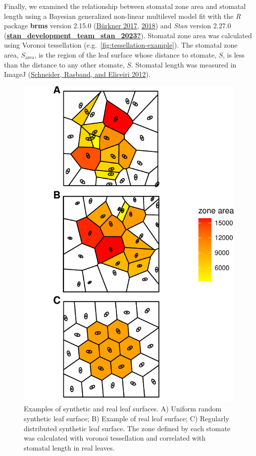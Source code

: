 \documentclass[12pt,halfline,a4paper,]{ouparticle}
\begin{document}
Finally, we examined the relationship between stomatal zone area and
stomatal length using a Bayesian generalized non-linear multilevel model
fit with the \emph{R} package \textbf{brms} version 2.15.0
(\protect\hyperlink{ref-burkner_brms_2017}{Bürkner 2017},
\protect\hyperlink{ref-burkner_advanced_2018}{2018}) and \emph{Stan}
version 2.27.0
(\protect\hyperlink{ref-stan_development_team_stan_2023}{\textbf{stan\_development\_team\_stan\_2023?}}).
Stomatal zone area was calculated using Voronoi tessellation
(e.g.~\autoref{fig:tessellation-example}). The stomatal zone area,
\(S_\text{area}\), is the region of the leaf surface whose distance to
stomate, \(S\), is less than the distance to any other stomate, \(S\).
Stomatal length was measured in ImageJ
(\protect\hyperlink{ref-schneider_nih_2012}{Schneider, Rasband, and
Eliceiri 2012}).

\begin{figure}[ht]
\includegraphics[width = \textwidth]{figures/tessellation-example.pdf}
\caption{Examples of synthetic and real leaf surfaces.  A) Uniform random synthetic leaf surface; B) Example of real leaf surface; C) Regularly distributed synthetic leaf surface. The zone defined by each stomate was calculated with voronoi tessellation and correlated with stomatal length in real leaves.}
\label{fig:tessellation-example}
\end{figure}
\end{document}
